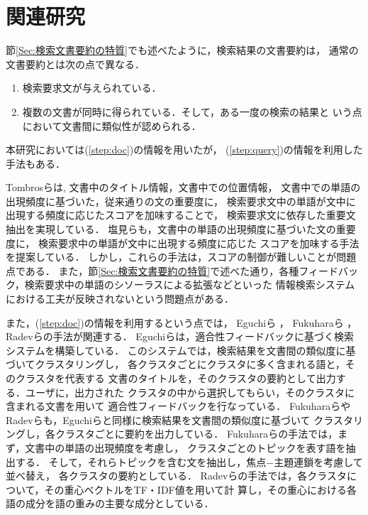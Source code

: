 \section{関連研究}
\label{Sec:関連研究}

節\ref{Sec:検索文書要約の特質}でも述べたように，検索結果の文書要約は，
通常の文書要約とは次の点で異なる．
\begin{enumerate}
 \item 検索要求文が与えられている．\label{step:query}
 \item 複数の文書が同時に得られている．そして，ある一度の検索の結果と
       いう点において文書間に類似性が認められる．\label{step:doc}
\end{enumerate}

本研究においては(\ref{step:doc})の情報を用いたが，
(\ref{step:query})の情報を利用した手法もある．

Tombrosら\cite{Tombros:AdvantagesOfQueryBiasedSummariesInInformationRetrieval}は, 文書中のタイトル情報，文書中での位置情報，
文書中での単語の出現頻度に基づいた，従来通りの文の重要度に，
検索要求文中の単語が文中に出現する頻度に応じたスコアを加味することで，
検索要求文に依存した重要文抽出を実現している．
塩見ら\cite{塩見:視点を考慮した文書要約手法の提案}も，文書中の単語の出現頻度に基づいた文の重要度に，
検索要求中の単語が文中に出現する頻度に応じた
スコアを加味する手法を提案している．
しかし，これらの手法は，スコアの制御が難しいことが問題点である．
また，節\ref{Sec:検索文書要約の特質}で述べた通り，各種フィードバック，検索要求中の単語のシソーラスによる拡張などといった
情報検索システムにおける工夫が反映されないという問題点がある．


また，(\ref{step:doc})の情報を利用するという点では，
Eguchiら
\cite{Eguchi:AdaptiveQueryExpansionBasedOnClusteringSearchResults}，
Fukuharaら
\cite{Fukuhara:Multiple-textSummarizationForCollectiveKnowledgeFormation}，
Radevら\cite{Radev:Centroid-basedSummarizationOfMultipleDocuments,Radev:Centroid-basedSummarizationOfMultipleDocuments}の手法が関連する．
Eguchiらは，適合性フィードバックに基づく検索システムを構築している．
このシステムでは，検索結果を文書間の類似度に基づいてクラスタリングし，
各クラスタごとにクラスタに多く含まれる語と，そのクラスタを代表する
文書のタイトルを，そのクラスタの要約として出力する．ユーザに，出力された
クラスタの中から選択してもらい，そのクラスタに含まれる文書を用いて
適合性フィードバックを行なっている．
FukuharaらやRadevらも，Eguchiらと同様に検索結果を文書間の類似度に基づいて
クラスタリングし，各クラスタごとに要約を出力している．
Fukuharaらの手法では，まず，文書中の単語の出現頻度を考慮し，
クラスタごとのトピックを表す語を抽出する．
そして，それらトピックを含む文を抽出し，焦点−主題連鎖を考慮して並べ替え，
各クラスタの要約としている．
Radevらの手法では，各クラスタについて，その重心ベクトルをTF・IDF値を用いて計
算し，その重心における各語の成分を語の重みの主要な成分としている．

